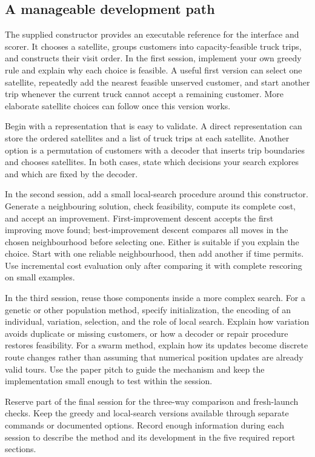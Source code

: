 \documentclass[11pt,a4paper]{article}
\begin{document}
\subsection{A manageable development path}
The supplied constructor provides an executable reference for the interface and scorer. It chooses a satellite, groups customers into capacity-feasible truck trips, and constructs their visit order. In the first session, implement your own greedy rule and explain why each choice is feasible. A useful first version can select one satellite, repeatedly add the nearest feasible unserved customer, and start another trip whenever the current truck cannot accept a remaining customer. More elaborate satellite choices can follow once this version works.

Begin with a representation that is easy to validate. A direct representation can store the ordered satellites and a list of truck trips at each satellite. Another option is a permutation of customers with a decoder that inserts trip boundaries and chooses satellites. In both cases, state which decisions your search explores and which are fixed by the decoder.

In the second session, add a small local-search procedure around this constructor. Generate a neighbouring solution, check feasibility, compute its complete cost, and accept an improvement. First-improvement descent accepts the first improving move found; best-improvement descent compares all moves in the chosen neighbourhood before selecting one. Either is suitable if you explain the choice. Start with one reliable neighbourhood, then add another if time permits. Use incremental cost evaluation only after comparing it with complete rescoring on small examples.

In the third session, reuse those components inside a more complex search. For a genetic or other population method, specify initialization, the encoding of an individual, variation, selection, and the role of local search. Explain how variation avoids duplicate or missing customers, or how a decoder or repair procedure restores feasibility. For a swarm method, explain how its updates become discrete route changes rather than assuming that numerical position updates are already valid tours. Use the paper pitch to guide the mechanism and keep the implementation small enough to test within the session.

Reserve part of the final session for the three-way comparison and fresh-launch checks. Keep the greedy and local-search versions available through separate commands or documented options. Record enough information during each session to describe the method and its development in the five required report sections.
\end{document}

